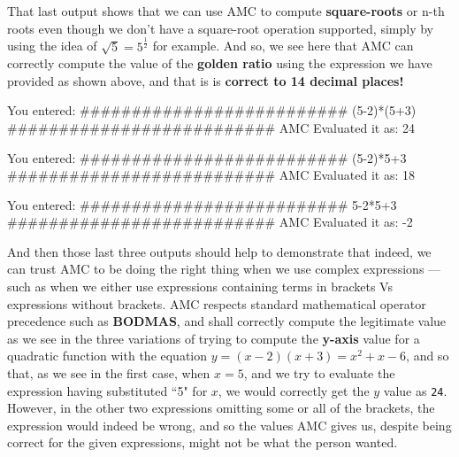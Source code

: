 \documentclass[a4paper, 18pt]{book} %
\begin{document}
{{{\vspace{2em}


That last output shows that we can use AMC to compute \textbf{square-roots} or n-th roots even though we don't have a square-root operation supported, simply by using the idea of $\sqrt{5} = 5^\frac{1}{2}$ for example. And so, we see here that AMC can correctly compute the value of the \textbf{golden ratio} using the expression we have provided as shown above, and that is is \textbf{correct to 14 decimal places!}


\vspace{2em}

     \begin{tcbverbatim}[title=Sample OUTPUT 3 from AMC v3.1]
You entered:
##########################
(5-2)*(5+3)
##########################
AMC Evaluated it as: 24
  \end{tcbverbatim}


\vspace{1em}


     \begin{tcbverbatim}[title=Sample OUTPUT 4 from AMC v3.1]
You entered:
##########################
(5-2)*5+3
##########################
AMC Evaluated it as: 18
  \end{tcbverbatim}


\vspace{1em}

\vspace{1em}


     \begin{tcbverbatim}[title=Sample OUTPUT 5 from AMC v3.1]
You entered:
##########################
5-2*5+3
##########################
AMC Evaluated it as: -2
  \end{tcbverbatim}

And then those last three outputs should help to demonstrate that indeed, we can trust AMC to be doing the right thing when we use complex expressions --- such as when we either use expressions containing terms in brackets Vs expressions without brackets. AMC respects standard mathematical operator precedence such as \textbf{BODMAS}, and shall correctly compute the legitimate value as we see in the three variations of trying to compute the \textbf{y-axis} value for a quadratic function with the equation $y = (x -2)(x+3) = x^2 + x - 6$, and so that, as we see in the first case, when $x=5$, and we try to evaluate the expression having substituted ``5" for $x$, we would correctly get the $y$ value as \texttt{24}. However, in the other two expressions omitting some or all of the brackets, the expression would indeed be wrong, and so the values AMC gives us, despite being correct for the given expressions, might not be what the person wanted. 

}}}
\end{document}
